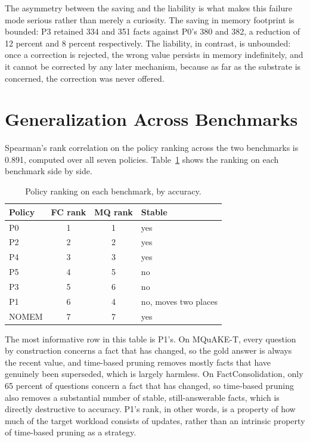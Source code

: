 The asymmetry between the saving and the liability is what makes this failure mode serious rather than merely a curiosity. The saving in memory footprint is bounded: P3 retained 334 and 351 facts against P0's 380 and 382, a reduction of 12 percent and 8 percent respectively. The liability, in contrast, is unbounded: once a correction is rejected, the wrong value persists in memory indefinitely, and it cannot be corrected by any later mechanism, because as far as the substrate is concerned, the correction was never offered.

\section{Generalization Across Benchmarks}
\label{sec:generalization}

Spearman's rank correlation on the policy ranking across the two benchmarks is 0.891, computed over all seven policies. Table~\ref{tab:generalization} shows the ranking on each benchmark side by side.

\begin{table}[H]
\centering
\caption{Policy ranking on each benchmark, by accuracy.}
\label{tab:generalization}
\begin{tabular}{lccl}
\toprule
Policy & FC rank & MQ rank & Stable \\
\midrule
P0 & 1 & 1 & yes \\
P2 & 2 & 2 & yes \\
P4 & 3 & 3 & yes \\
P5 & 4 & 5 & no \\
P3 & 5 & 6 & no \\
P1 & 6 & 4 & no, moves two places \\
NOMEM & 7 & 7 & yes \\
\bottomrule
\end{tabular}
\end{table}

The most informative row in this table is P1's. On MQuAKE-T, every question by construction concerns a fact that has changed, so the gold answer is always the recent value, and time-based pruning removes mostly facts that have genuinely been superseded, which is largely harmless. On FactConsolidation, only 65 percent of questions concern a fact that has changed, so time-based pruning also removes a substantial number of stable, still-answerable facts, which is directly destructive to accuracy. P1's rank, in other words, is a property of how much of the target workload consists of updates, rather than an intrinsic property of time-based pruning as a strategy.

